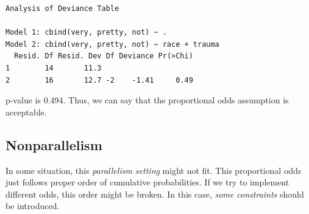 \documentclass[]{book}
\newenvironment{Shaded}{\begin{snugshade}}{\end{snugshade}}
\newcommand{\DataTypeTok}[1]{\textcolor[rgb]{0.13,0.29,0.53}{#1}}
\newcommand{\DecValTok}[1]{\textcolor[rgb]{0.00,0.00,0.81}{#1}}
\newcommand{\KeywordTok}[1]{\textcolor[rgb]{0.13,0.29,0.53}{\textbf{#1}}}
\newcommand{\NormalTok}[1]{#1}
\newcommand{\OperatorTok}[1]{\textcolor[rgb]{0.81,0.36,0.00}{\textbf{#1}}}
\newcommand{\OtherTok}[1]{\textcolor[rgb]{0.56,0.35,0.01}{#1}}
\newcommand{\StringTok}[1]{\textcolor[rgb]{0.31,0.60,0.02}{#1}}
\begin{document}
\begin{Shaded}
\end{Shaded}

\begin{verbatim}
Analysis of Deviance Table

Model 1: cbind(very, pretty, not) ~ .
Model 2: cbind(very, pretty, not) ~ race + trauma
  Resid. Df Resid. Dev Df Deviance Pr(>Chi)
1        14       11.3                     
2        16       12.7 -2    -1.41     0.49
\end{verbatim}

p-value is 0.494. Thus, we can say that the proportional odds assumption is acceptable.

\hypertarget{nonparallelism}{%
\subsection{Nonparallelism}\label{nonparallelism}}

In some situation, this \emph{parallelism setting} might not fit. This proportional odds just follows proper order of cumulative probabilities. If we try to implement different odds, this order might be broken. In this case, \emph{some constraints} should be introduced.
\end{document}
